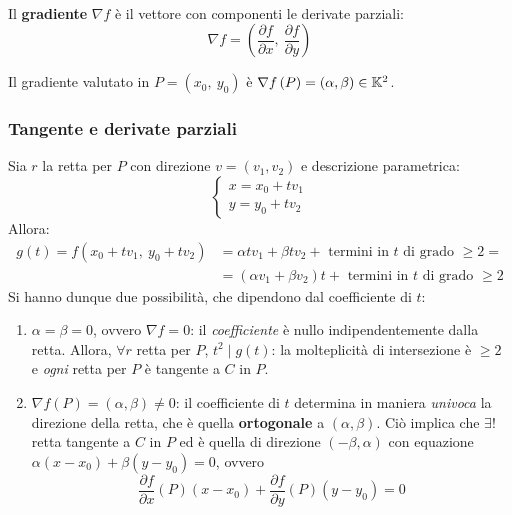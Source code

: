 \begin{define}[Gradiente.]~{}\\
	Il \textbf{gradiente} $\nabla f$ è il vettore con componenti le derivate parziali:
	\begin{equation}
		\nabla f=\left( \frac{\partial{f}}{\partial{x}},\ \frac{\partial{f}}{\partial{y}} \right)
	\end{equation}
\vspace{-6mm}
\end{define}
Il gradiente valutato in $P=(x_0,\ y_0)$ è $\nabla f\left(P\right)=(\alpha,\beta)\in\mathbb{K}^2$.\\
\subsubsection{Tangente e derivate parziali}
Sia $r$ la retta per $P$ con direzione $v=(v_1,v_2)$ e descrizione parametrica:
\begin{equation*}
	\begin{cases}
		x=x_0+tv_1\\
		y=y_0+tv_2
	\end{cases}
\end{equation*}
Allora:
	\begin{equation*}
		\begin{array}{ll}
			g(t)=f(x_0+tv_1,\ y_0+tv_2)&=\alpha tv_1+\beta tv_2 + \text{ termini in }t\text{ di grado }\geq 2 =\\
			&= (\alpha v_1+\beta v_2)t + \text{ termini in }t \text{ di grado }\geq 2
		\end{array}	
	\end{equation*}
Si hanno dunque due possibilità, che dipendono dal coefficiente di $t$:
	\begin{enumerate}
		\item	$\alpha=\beta=0$, ovvero $\nabla f =0$: il \textit{coefficiente} è nullo indipendentemente dalla retta. Allora, $\forall r$ retta per $P$,  $t^2 \mid g(t)$: la molteplicità di intersezione è $\geq 2$ e \textit{ogni} retta per $P$ è tangente a $C$ in $P$.
		\item	$\nabla f\left(P\right)=(\alpha,\beta)\neq 0$:	il coefficiente di $t$ determina in maniera \textit{univoca} la direzione della retta, che è quella \textbf{ortogonale} a $(\alpha,\beta)$. Ciò implica che $\exists !$ retta tangente a $C$ in $P$ ed è quella di direzione $(-\beta,\alpha)$ con equazione	$\alpha(x-x_0)+\beta(y-y_0)=0$, ovvero
			\begin{equation}
				\frac{\partial{f}}{\partial{x}}\left(P\right)(x-x_0) + \frac{\partial{f}}{\partial{y}} \left(P\right)(y-y_0)=0
			\end{equation}
	\end{enumerate}
